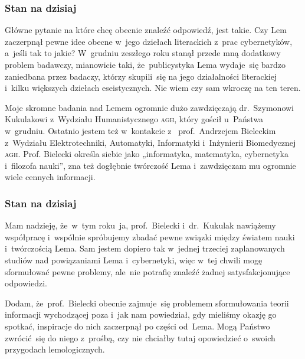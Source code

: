 \documentclass[10pt,t]{beamer}
\begin{document}
\begin{frame}
  \frametitle{Stan na dzisiaj}


  Główne pytanie na które chcę obecnie znaleźć odpowiedź, jest takie.
  Czy Lem zaczerpnął pewne idee obecne w~jego dziełach literackich z~prac
  cybernetyków, a~jeśli tak to jakie? W~grudniu zeszłego roku stanął przede
  mną dodatkowy problem badawczy, mianowicie taki, że~publicystyka Lema
  wydaje~się bardzo zaniedbana przez badaczy, którzy skupili~się na jego
  działalności literackiej i~kilku większych dziełach eseistycznych. Nie
  wiem czy sam wkroczę na ten teren.

  Moje skromne badania nad Lemem ogromnie dużo zawdzięczają
  {dr.~Szymonowi Kukulakowi} z~Wydziału Humanistycznego \textsc{agh}, który
  gościł u~Państwa w~grudniu. Ostatnio jestem też w~kontakcie
  z~
  {prof.~Andrzejem Bieleckim} z~Wydziału Elektrotechniki, Automatyki,
  Informatyki i~Inżynierii Biomedycznej \textsc{agh}. Prof. Bielecki określa
  siebie jako „informatyka, matematyka, cybernetyka i~filozofa nauki”, zna
  też dogłębnie twórczość Lema i~zawdzięczam mu ogromnie wiele cennych
  informacji.

\end{frame}





\begin{frame}
  \frametitle{Stan na dzisiaj}


  Mam nadzieję, że~w~tym roku~ja, prof.~Bielecki i~dr.~Kukulak nawiążemy
  współpracę i~wspólnie spróbujemy zbadać pewne związki między światem nauki
  i~twórczością Lema. Sam jestem dopiero tak w~jednej trzeciej
  zaplanowanych studiów nad powiązaniami Lema i~cybernetyki, więc w~tej
  chwili mogę sformułować pewne problemy, ale~nie potrafię znaleźć żadnej
  satysfakcjonujące odpowiedzi.

  Dodam, że~prof.~Bielecki obecnie zajmuje~się problemem sformułowania
  teorii informacji wychodzącej poza
   i~jak nam powiedział, gdy mieliśmy okazję go spotkać,
  inspiracje do nich zaczerpnął po części od~Lema. Mogą Państwo zwrócić~się
  do niego z~prośbą, czy nie chciałby tutaj opowiedzieć o~swoich przygodach
  lemologicznych.

\end{frame}
\end{document}
